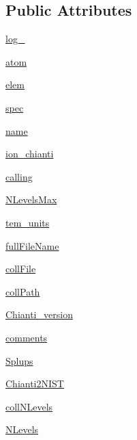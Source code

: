 \subsection*{Public Attributes}
\begin{DoxyCompactItemize}
\item 
\hyperlink{classpyneb_1_1utils_1_1pn__chianti_1_1___coll_chianti_afd87151907f32bc0dc45f0171b61374e}{log\+\_\+}
\item 
\hyperlink{classpyneb_1_1utils_1_1pn__chianti_1_1___coll_chianti_a0c5c7091b1d8a95d9bee2744d713f5c9}{atom}
\item 
\hyperlink{classpyneb_1_1utils_1_1pn__chianti_1_1___coll_chianti_a62e73dc66c7aff7941c5ce94e808c23a}{elem}
\item 
\hyperlink{classpyneb_1_1utils_1_1pn__chianti_1_1___coll_chianti_adaf1b66faf18504ec4b5c8c0b7f6763b}{spec}
\item 
\hyperlink{classpyneb_1_1utils_1_1pn__chianti_1_1___coll_chianti_ab74e6bf80237ddc4109968cedc58c151}{name}
\item 
\hyperlink{classpyneb_1_1utils_1_1pn__chianti_1_1___coll_chianti_afcfd897e5617cc9f3a7239ef78e821ee}{ion\+\_\+chianti}
\item 
\hyperlink{classpyneb_1_1utils_1_1pn__chianti_1_1___coll_chianti_ab25fa7ebe84b603684dee62410c1e34c}{calling}
\item 
\hyperlink{classpyneb_1_1utils_1_1pn__chianti_1_1___coll_chianti_ab31c0831aaa2261a91f8c60c66c7eec0}{N\+Levels\+Max}
\item 
\hyperlink{classpyneb_1_1utils_1_1pn__chianti_1_1___coll_chianti_a538e48ab1f2ca63dbe55abea69ca2242}{tem\+\_\+units}
\item 
\hyperlink{classpyneb_1_1utils_1_1pn__chianti_1_1___coll_chianti_a6df8c03c050eea50de355d36d398c5b8}{full\+File\+Name}
\item 
\hyperlink{classpyneb_1_1utils_1_1pn__chianti_1_1___coll_chianti_ab1799c18dddda68ec8651caf93c90e40}{coll\+File}
\item 
\hyperlink{classpyneb_1_1utils_1_1pn__chianti_1_1___coll_chianti_adde256ff299a719e21c78ff9aad1b68c}{coll\+Path}
\item 
\hyperlink{classpyneb_1_1utils_1_1pn__chianti_1_1___coll_chianti_a1caebb547c4fc66d6e9136a4009d8010}{Chianti\+\_\+version}
\item 
\hyperlink{classpyneb_1_1utils_1_1pn__chianti_1_1___coll_chianti_a64b8b36116751d566275b722e40bb3a7}{comments}
\item 
\hyperlink{classpyneb_1_1utils_1_1pn__chianti_1_1___coll_chianti_a63c12105b815881336686c9a46aadda2}{Splups}
\item 
\hyperlink{classpyneb_1_1utils_1_1pn__chianti_1_1___coll_chianti_a48e401b4ff0a724d7b4d697b02a59846}{Chianti2\+N\+I\+S\+T}
\item 
\hyperlink{classpyneb_1_1utils_1_1pn__chianti_1_1___coll_chianti_a6bf0c64181b0f528302aeeaa628638dd}{coll\+N\+Levels}
\item 
\hyperlink{classpyneb_1_1utils_1_1pn__chianti_1_1___coll_chianti_a4d45fe163c2108853ab418386bf4da56}{N\+Levels}
\end{DoxyCompactItemize}


